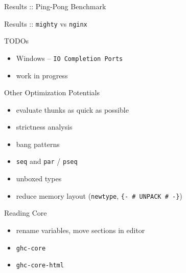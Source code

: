 \documentclass{beamer}
\begin{document}
\begin{frame}{Results :: Ping-Pong Benchmark}
  \centering
\end{frame}

\begin{frame}{Results :: \texttt{mighty} vs \texttt{nginx}}
  \centering
\end{frame}

\begin{frame}{TODOs}
  \begin{itemize}
    \item Windows \pause -- \texttt{IO Completion Ports}
    \pause
    \item work in progress
  \end{itemize}
\end{frame}

\begin{frame}{Other Optimization Potentials}
  \begin{itemize}
    \item evaluate thunks as quick as possible
    \item strictness analysis
    \item bang patterns
    \item \texttt{seq} and \texttt{par} / \texttt{pseq}
    \pause
    \item unboxed types
    \item reduce memory layout (\texttt{newtype}, \texttt{\{- \# UNPACK \#
    -\}})
  \end{itemize}
  \pause
  \centering
\end{frame}

\begin{frame}{Reading Core}
  \begin{itemize}[<+->]
    \item rename variables, move sections in editor
    \item \texttt{ghc-core}
    \item \texttt{ghc-core-html}
  \end{itemize}
\end{frame}
\end{document}
